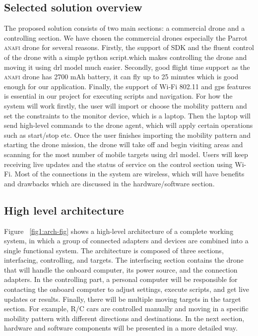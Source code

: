 \documentclass[../main.tex]{subfiles}
\begin{document}
\subsection{Selected solution overview}
The proposed solution consists of two main sections: a commercial drone and a controlling section.
We have chosen the commercial drones especially the Parrot \textsc{anafi} drone for several reasons.
Firstly, the support of SDK and the fluent control of the drone with a simple python script.which makes controlling the drone and moving it using \gls{drl} model much easier. 
Secondly, good flight time support as the \textsc{anafi} drone has 2700 mAh battery, it can fly up to 25 minutes which is good enough for our application.
Finally, the support of Wi-Fi 802.11 and \gls{gps} features is essential in our project for executing scripts and navigation. 
For how the system will work firstly, the user will import or choose the mobility pattern and set the constraints to the monitor device, which is a laptop.
Then the laptop will send high-level commands to the drone agent, which will apply certain operations such as start/stop etc.
Once the user finishes importing the mobility pattern and starting the drone mission, the drone will take off and begin visiting areas and scanning for the most number of mobile targets using \gls{drl} model.
Users will keep receiving live updates and the status of service on the control section using Wi-Fi.
Most of the connections in the system are wireless, which will have benefits and drawbacks  which are discussed in the hardware/software section.

\newpage
\subsection{High level architecture}
Figure ~\ref{fig1:arch-fig} shows a high-level architecture of a complete working system, in which a group of connected adapters and devices are combined into a single functional system. The architecture is composed of three sections, interfacing, controlling, and targets. The interfacing section contains the drone that will handle the onboard computer, its power source, and the connection adapters. In the controlling part, a personal computer will be responsible for contacting the onboard computer to adjust settings, execute scripts, and get live updates or results. Finally, there will be multiple moving targets in the target section. For example, R/C cars are controlled manually and moving in a specific mobility pattern with different directions and destinations. In the next section, hardware and software components will be presented in a more detailed way.
\end{document}
